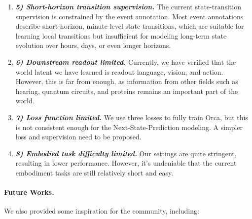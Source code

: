 \begin{enumerate}[
    leftmargin=1.35em,
    itemsep=0.35em,
    topsep=0.35em,
    parsep=0em
]
    \item[] \textit{\textbf{5) Short-horizon transition supervision.}}
    The current state-transition supervision is constrained by the event annotation. Most event annotations describe short-horizon, minute-level state transitions, which are suitable for learning local transitions but insufficient for modeling long-term state evolution over hours, days, or even longer horizons. 


    \item[] \textit{\textbf{6) Downstream readout limited.}} Currently, we have verified that the world latent we have learned is readout language, vision, and action. However, this is far from enough, as information from other fields such as hearing, quantum circuits, and proteins remains an important part of the world. 
    
    \item[] \textit{\textbf{7) Loss function limited.}} We use three losses to fully train Orca, but this is not consistent enough for the Next-State-Prediction modeling. A simpler loss and supervision need to be proposed.

    \item[] \textit{\textbf{8) Embodied task difficulty limited.}} Our settings are quite stringent, resulting in lower performance. However, it's undeniable that the current embodiment tasks are still relatively short and easy.

\end{enumerate}


\vspace{-0.5em}
\paragraph{Future Works.}
We also provided some inspiration for the community, including:

